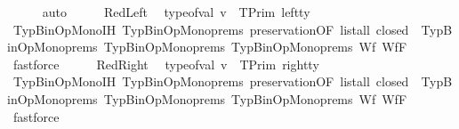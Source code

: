 \begin{isabellebody}
\ \ \ \ \isamarkupfalse%
\ auto\isanewline
\ \ \isamarkupfalse%
\ \isamarkupfalse%
\ RedLeft\ \isamarkupfalse%
\ {\isachardoublequoteopen}type{\isacharunderscore}{\kern0pt}of{\isacharunderscore}{\kern0pt}val\ v{}\ {\isacharequal}{\kern0pt}\ TPrim\ left{\isacharunderscore}{\kern0pt}ty{\isachardoublequoteclose}\isanewline
\ \ \ \ \isamarkupfalse%
\ TypBinOpMono{\isachardot}{\kern0pt}IH\ TypBinOpMono{\isachardot}{\kern0pt}prems\ preservation{\isacharparenleft}{\kern0pt}{}{\isacharparenright}{\kern0pt}{\isacharbrackleft}{\kern0pt}OF\ {\isacartoucheopen}list{\isacharunderscore}{\kern0pt}all\ closed\ {\isasymOmega}{\isacartoucheclose}\ TypBinOpMono{\isachardot}{\kern0pt}prems{\isacharparenleft}{\kern0pt}{}{\isacharparenright}{\kern0pt}\ TypBinOpMono{\isachardot}{\kern0pt}prems{\isacharparenleft}{\kern0pt}{}{\isacharparenright}{\kern0pt}\ TypBinOpMono{\isachardot}{\kern0pt}prems{\isacharparenleft}{\kern0pt}{}{\isacharparenright}{\kern0pt}\ Wf{\isacharunderscore}{\kern0pt}{\isasymGamma}\ Wf{\isacharunderscore}{\kern0pt}F{\isacharbrackright}{\kern0pt}\isanewline
\ \ \ \ \isamarkupfalse%
\ fastforce\isanewline
\ \ \isamarkupfalse%
\ \isamarkupfalse%
\ RedRight\ \isamarkupfalse%
\ {\isachardoublequoteopen}type{\isacharunderscore}{\kern0pt}of{\isacharunderscore}{\kern0pt}val\ v{}\ {\isacharequal}{\kern0pt}\ TPrim\ right{\isacharunderscore}{\kern0pt}ty{\isachardoublequoteclose}\isanewline
\ \ \ \ \isamarkupfalse%
\ TypBinOpMono{\isachardot}{\kern0pt}IH\ TypBinOpMono{\isachardot}{\kern0pt}prems\ preservation{\isacharparenleft}{\kern0pt}{}{\isacharparenright}{\kern0pt}{\isacharbrackleft}{\kern0pt}OF\ {\isacartoucheopen}list{\isacharunderscore}{\kern0pt}all\ closed\ {\isasymOmega}{\isacartoucheclose}\ TypBinOpMono{\isachardot}{\kern0pt}prems{\isacharparenleft}{\kern0pt}{}{\isacharparenright}{\kern0pt}\ TypBinOpMono{\isachardot}{\kern0pt}prems{\isacharparenleft}{\kern0pt}{}{\isacharparenright}{\kern0pt}\ TypBinOpMono{\isachardot}{\kern0pt}prems{\isacharparenleft}{\kern0pt}{}{\isacharparenright}{\kern0pt}\ Wf{\isacharunderscore}{\kern0pt}{\isasymGamma}\ Wf{\isacharunderscore}{\kern0pt}F{\isacharbrackright}{\kern0pt}\isanewline
\ \ \ \ \isamarkupfalse%
\ fastforce\isanewline
\ \ \isamarkupfalse%
\ \isamarkupfalse%

\end{isabellebody}
